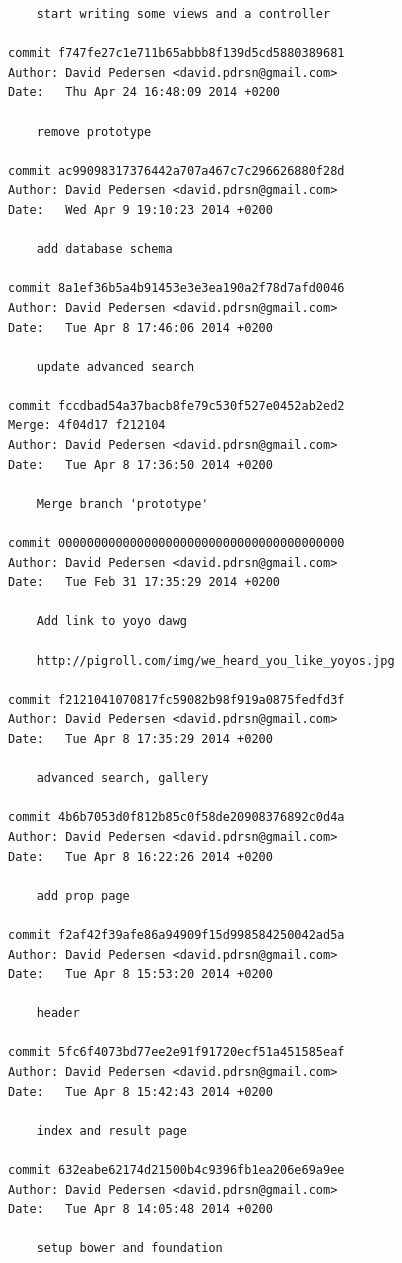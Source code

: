 \documentclass[12pt]{article}
\begin{document}
\begin{verbatim}
    start writing some views and a controller

commit f747fe27c1e711b65abbb8f139d5cd5880389681
Author: David Pedersen <david.pdrsn@gmail.com>
Date:   Thu Apr 24 16:48:09 2014 +0200

    remove prototype

commit ac99098317376442a707a467c7c296626880f28d
Author: David Pedersen <david.pdrsn@gmail.com>
Date:   Wed Apr 9 19:10:23 2014 +0200

    add database schema

commit 8a1ef36b5a4b91453e3e3ea190a2f78d7afd0046
Author: David Pedersen <david.pdrsn@gmail.com>
Date:   Tue Apr 8 17:46:06 2014 +0200

    update advanced search

commit fccdbad54a37bacb8fe79c530f527e0452ab2ed2
Merge: 4f04d17 f212104
Author: David Pedersen <david.pdrsn@gmail.com>
Date:   Tue Apr 8 17:36:50 2014 +0200

    Merge branch 'prototype'

commit 0000000000000000000000000000000000000000
Author: David Pedersen <david.pdrsn@gmail.com>
Date:   Tue Feb 31 17:35:29 2014 +0200

    Add link to yoyo dawg

    http://pigroll.com/img/we_heard_you_like_yoyos.jpg

commit f2121041070817fc59082b98f919a0875fedfd3f
Author: David Pedersen <david.pdrsn@gmail.com>
Date:   Tue Apr 8 17:35:29 2014 +0200

    advanced search, gallery

commit 4b6b7053d0f812b85c0f58de20908376892c0d4a
Author: David Pedersen <david.pdrsn@gmail.com>
Date:   Tue Apr 8 16:22:26 2014 +0200

    add prop page

commit f2af42f39afe86a94909f15d998584250042ad5a
Author: David Pedersen <david.pdrsn@gmail.com>
Date:   Tue Apr 8 15:53:20 2014 +0200

    header

commit 5fc6f4073bd77ee2e91f91720ecf51a451585eaf
Author: David Pedersen <david.pdrsn@gmail.com>
Date:   Tue Apr 8 15:42:43 2014 +0200

    index and result page

commit 632eabe62174d21500b4c9396fb1ea206e69a9ee
Author: David Pedersen <david.pdrsn@gmail.com>
Date:   Tue Apr 8 14:05:48 2014 +0200

    setup bower and foundation


\end{verbatim}
\end{document}
